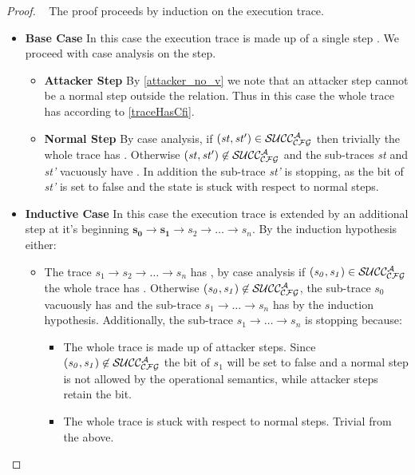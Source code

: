 \begin{proof} 
  ~ The proof proceeds by induction on the execution trace.
  \begin{itemize}
  \item \textbf{Base Case} In this case the execution trace is made up
    of a single step . We proceed with case analysis on
    the step.
    \begin{itemize}
    \item \textbf{Attacker Step} By \cref{attacker_no_v} we
      note that an attacker step cannot be a normal step outside the
       relation. Thus in this case the whole trace has \CFI
      according to \cref{traceHasCfi}.
    \item \textbf{Normal Step} By case analysis, if
      $(\mathit{st},\mathit{st'}) \in \mathcal{SUCC_\mathcal{CFG}^{A}}$ then trivially the
      whole trace has \CFI. Otherwise $(\mathit{st},\mathit{st'}) \not
      \in \mathcal{SUCC_\mathcal{CFG}^{A}}$ and the sub-traces \textit{st} and \textit{st'}
      vacuously have \CFI. In addition the sub-trace \textit{st'} is
      stopping, as the \ok bit of \textit{st'} is set to false and the
      state is stuck with respect to normal steps.
    \end{itemize}
  \item \textbf{Inductive Case} In this case the execution trace is
    extended by an additional step at it's beginning
    $\mathbf{s_0 \to s_1} \to s_2 \to \ldots \to s_n$. 
    By the induction hypothesis either:
    \begin{itemize}
    \item The trace $s_1 \to s_2 \to \ldots \to s_n$ has \CFI, by case
      analysis if $(\mathit{s_0},\mathit{s_1}) \in \mathcal{SUCC_\mathcal{CFG}^{A}}$ the
      whole trace has \CFI. Otherwise $(\mathit{s_0},\mathit{s_1})
      \not \in \mathcal{SUCC_\mathcal{CFG}^{A}}$, the sub-trace $s_0$ vacuously has \CFI and
      the sub-trace $s_1 \to \ldots \to s_n$ has \CFI by the induction
      hypothesis. Additionally, the sub-trace $s_1 \to \ldots \to s_n$
      is stopping because:
      \begin{itemize}
        \item The whole trace is made up of attacker steps.
           Since $(\mathit{s_0},\mathit{s_1}) \not \in \mathcal{SUCC_\mathcal{CFG}^{A}}$
           the \ok bit of $s_1$ will be set to false and a normal
           step is not allowed by the operational semantics,
           while attacker steps retain the \ok bit.
         \item The whole trace is stuck with respect to normal steps.
           Trivial from the above.

\end{itemize}
\end{itemize}
\end{itemize}
\end{proof}
